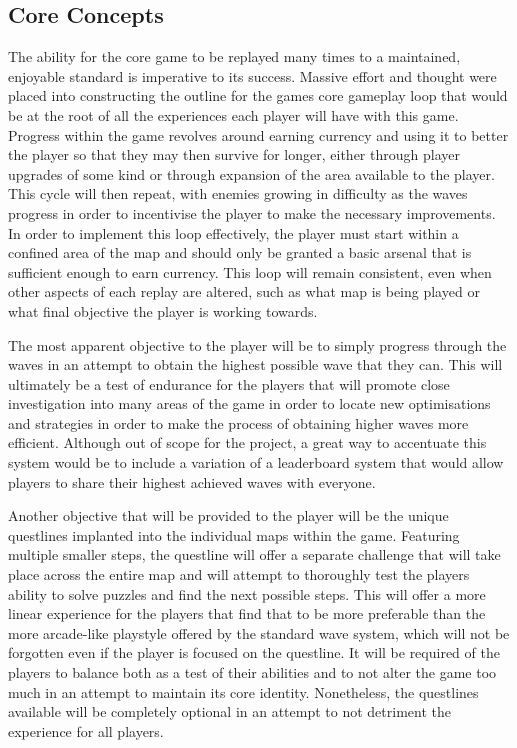 \documentclass[11pt]{article}
\begin{document}
\subsection{Core Concepts}
The ability for the core game to be replayed many times to a maintained, enjoyable standard is
imperative to its success. Massive effort and thought were placed into constructing the outline for
the games core gameplay loop that would be at the root of all the experiences each player will have
with this game. Progress within the game revolves around earning currency and using it to better
the player so that they may then survive for longer, either through player upgrades of some kind or
through expansion of the area available to the player. This cycle will then repeat, with enemies
growing in difficulty as the waves progress in order to incentivise the player to make the
necessary improvements. In order to implement this loop effectively, the player must start within a
confined area of the map and should only be granted a basic arsenal that is sufficient enough to
earn currency. This loop will remain consistent, even when other aspects of each replay are
altered, such as what map is being played or what final objective the player is working towards.

The most apparent objective to the player will be to simply progress through the waves in an
attempt to obtain the highest possible wave that they can. This will ultimately be a test of
endurance for the players that will promote close investigation into many areas of the game in
order to locate new optimisations and strategies in order to make the process of obtaining higher
waves more efficient. Although out of scope for the project, a great way to accentuate this system
would be to include a variation of a leaderboard system that would allow players to share their
highest achieved waves with everyone.

Another objective that will be provided to the player will be the unique questlines implanted into
the individual maps within the game. Featuring multiple smaller steps, the questline will offer a
separate challenge that will take place across the entire map and will attempt to thoroughly test
the players ability to solve puzzles and find the next possible steps. This will offer a more
linear experience for the players that find that to be more preferable than the more arcade-like
playstyle offered by the standard wave system, which will not be forgotten even if the player is
focused on the questline. It will be required of the players to balance both as a test of their
abilities and to not alter the game too much in an attempt to maintain its core identity.
Nonetheless, the questlines available will be completely optional in an attempt to not detriment
the experience for all players.
\end{document}
